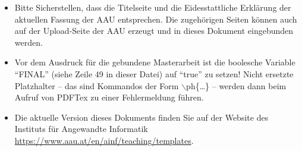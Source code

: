 \documentclass[11pt,twoside,openright,english]{klureport}
\begin{document}
{{\begin{itemize}
\begin{itemize}
			\end{itemize}
			\item Bitte Sicherstellen, dass die Titelseite und die Eidesstattliche Erklärung der aktuellen Fassung der AAU entsprechen. Die zugehörigen Seiten können auch auf der Upload-Seite der AAU erzeugt und in dieses Dokument eingebunden werden.
			\item Vor dem Ausdruck für die gebundene Masterarbeit ist die boolesche Variable ``FINAL'' (siehe Zeile 49 in dieser Datei)
			auf ``true'' zu setzen! Nicht ersetzte Platzhalter -- das sind Kommandos der Form $\backslash$ph\{\ldots\} -- werden dann beim Aufruf von PDFTex zu einer Fehlermeldung führen.
			\item Die aktuelle Version dieses Dokuments finden Sie auf der Website des Instituts für Angewandte Informatik \url{https://www.aau.at/en/ainf/teaching/templates}.
		\end{itemize}
}}

\newtableofcontents

\mainmatter   %










%
%

%

%

%
%
\appendix
\end{document}
